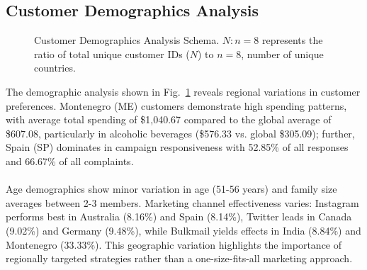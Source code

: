 \documentclass[12pt,a4paper]{article}
\begin{document}
\subsection{Customer Demographics Analysis}
\begin{figure}[!htbp]
\centering
{}
\caption{Customer Demographics Analysis Schema. $N:n=8$ represents the ratio of total unique customer IDs ($N$) to $n=8$, number of unique countries.}
\label{fig:demographics-schema}
\end{figure}
The demographic analysis shown in Fig.~\ref{fig:demographics-schema} reveals regional variations in customer preferences. Montenegro (ME) customers demonstrate high spending patterns, with average total spending of \$1,040.67 compared to the global average of \$607.08, particularly in alcoholic beverages (\$576.33 vs. global \$305.09); further, Spain (SP) dominates in campaign responsiveness with 52.85\% of all responses and 66.67\% of all complaints.\\
\\
Age demographics show minor variation in age (51-56 years) and family size averages between 2-3 members. Marketing channel effectiveness varies: Instagram performs best in Australia (8.16\%) and Spain (8.14\%), Twitter leads in Canada (9.02\%) and Germany (9.48\%), while Bulkmail yields effects in India (8.84\%) and Montenegro (33.33\%). This geographic variation highlights the importance of regionally targeted strategies rather than a one-size-fits-all marketing approach.
\end{document}
